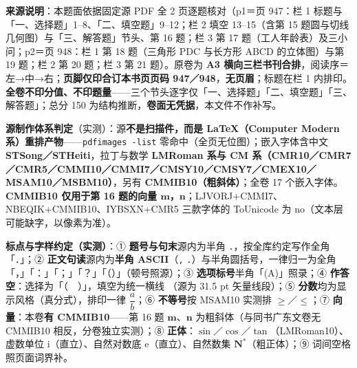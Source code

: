 


\begin{gktip}
\textbf{来源说明}：本题面依据固定源 PDF 全 2 页逐题核对（p1＝页 947：栏 1 标题与「一、选择题」1–8、「二、填空题」9–12；栏 2 填空 13–15（含第 15 题圆与切线几何图）与「三、解答题」节头、第 16 题；栏 3 第 17 题（工人年龄表）及三小问；p2＝页 948：栏 1 第 18 题（三角形 PDC 与长方形 ABCD 的立体图）与第 19 题；栏 2 第 20 题；栏 3 第 21 题）。原卷为 \textbf{A3 横向三栏书刊合排}，阅读序＝左→中→右；\textbf{页脚仅印合订本书页页码 947／948}，\textbf{无页眉}；标题在栏 1 内排印。\textbf{全卷不印分值、不印题量}——三个节头逐字仅「一、选择题」「二、填空题」「三、解答题」；总分 150 为结构推断，\textbf{卷面无凭据}，本文件不作补写。

\textbf{源制作体系判定}（实测）：源\textbf{不是扫描件，而是 LaTeX（Computer Modern 系）重排产物}——\texttt{pdfimages -list} 零命中（全页无位图）；嵌入字体含中文 \textbf{STSong／STHeiti}，拉丁与数学 \textbf{LMRoman 系与 CM 系（CMR10／CMR7／CMR5／CMMI10／CMMI7／CMSY10／CMSY7／CMEX10／MSAM10／MSBM10）}，另有 \textbf{CMMIB10（粗斜体）}；全卷 17 个嵌入字体。\textbf{CMMIB10 仅用于第 16 题的向量 \(\boldsymbol{m}\)，\(\boldsymbol{n}\)}；LJVORJ+CMMI7、NBEQIK+CMMIB10、IYBSXN+CMR5 三款字体的 ToUnicode 为 no（文本层可能缺字，以像素为准）。

\textbf{标点与字样约定（实测）}：① \textbf{题号与句末}源内为半角 \texttt{.}，按全库约定写作全角「．」；② \textbf{正文句读}源内为\textbf{半角 ASCII}（\texttt{,} \texttt{.}）与半角圆括号，一律归一为全角「，」「：」「；」「？」「（）」（顿号照源）；③ \textbf{选项标号}半角「(A)」照录；④ \textbf{作答空}：选择为「（　）」，填空为统一横线 \texttt{\gkblank{}}（源为 31.5 pt 矢量线段）；⑤ \textbf{分数}均为显示风格（真分式），排印一律 \(\dfrac{a}{b}\)；⑥ \textbf{不等号}按 MSAM10 实测排 \(\geqslant\)／\(\leqslant\)；⑦ \textbf{向量}：本卷\textbf{有 CMMIB10}——第 16 题 \(\boldsymbol{m}\)、\(\boldsymbol{n}\) 为粗斜体（与同书广东文卷无 CMMIB10 相反，分卷独立实测）；⑧ \textbf{正体}：\(\sin\)／\(\cos\)／\(\tan\)（LMRoman10）、虚数单位 \(\mathrm{i}\)（直立）、自然对数底 \(\mathrm{e}\)（直立）、自然数集 \(\mathbf{N}^*\)（粗正体）；⑨ 词间空格照页面词界补。


\end{gktip}
